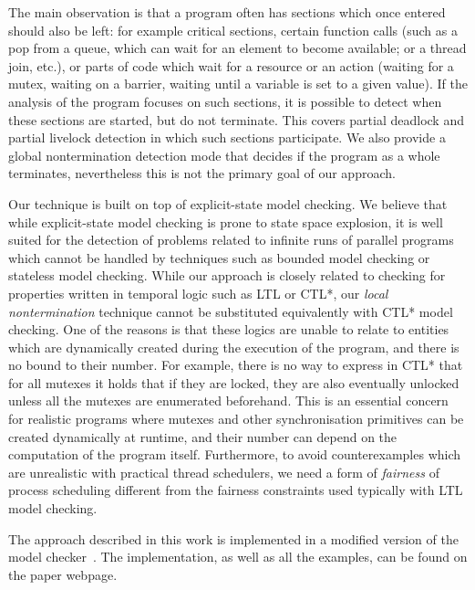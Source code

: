 The main observation is that a program often has sections which once entered
should also be left: for example critical sections, certain function calls (such
as a pop from a queue, which can wait for an element to become available; or a
thread join, etc.), or parts of code which wait for a resource or an action (waiting for a mutex, waiting on a barrier, waiting until a variable is set to a given value).
If the analysis of the program focuses on such sections, it is possible to
detect when these sections are started, but do not terminate.
This covers partial deadlock and partial livelock detection in which such sections participate.
We also provide a global nontermination detection mode that decides if the
program as a whole terminates, nevertheless this is not the primary goal of our approach.

Our technique is built on top of explicit-state model checking.  We believe that while explicit-state model checking is prone to state space explosion, it is well suited for the detection of problems related to infinite runs of parallel programs which cannot be handled by techniques such as bounded model checking or stateless model checking.
While our approach is closely related to checking for properties written in temporal logic such as LTL or CTL*, our \emph{local nontermination} technique cannot be substituted equivalently with CTL* model checking.
One of the reasons is that these logics are unable to relate to entities which are dynamically created during the execution of the program, and there is no bound to their number.
For example, there is no way to express in CTL* that for all mutexes it holds that if they are locked, they are also eventually unlocked unless all the mutexes are enumerated beforehand.
This is an essential concern for realistic programs where mutexes and other synchronisation primitives can be created dynamically at runtime, and their number can depend on the computation of the program itself.
Furthermore, to avoid counterexamples which are unrealistic with practical
thread schedulers, we need a form of \emph{fairness} of process scheduling
different from the fairness constraints used typically with LTL model checking.


The approach described in this work is implemented in a modified version of the \divine model checker~.
The implementation, as well as all the examples, can be found on the paper webpage.






